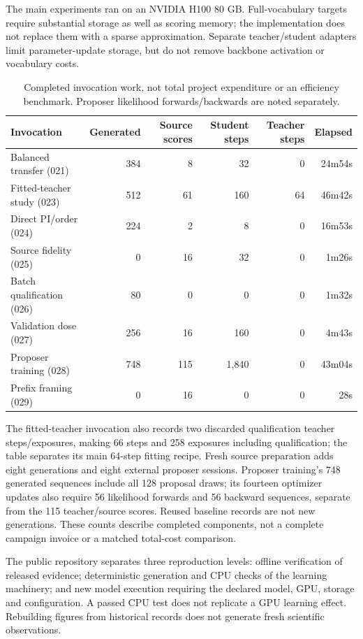 \documentclass[11pt,letterpaper]{article}
\begin{document}
The main experiments ran on an NVIDIA H100 80 GB. Full-vocabulary targets require substantial storage as well as scoring memory; the implementation does not replace them with a sparse approximation. Separate teacher/student adapters limit parameter-update storage, but do not remove backbone activation or vocabulary costs.

\begin{table}[htbp]
\centering\scriptsize
\caption{Completed invocation work, not total project expenditure or an efficiency benchmark. Proposer likelihood forwards/backwards are noted separately.}
\label{tab:work}
\begin{tabular}{L{1.72in}rrrrr}
\toprule
Invocation & Generated & Source scores & Student steps & Teacher steps & Elapsed\\
\midrule
Balanced transfer (021) & 384 & 8 & 32 & 0 & 24m54s\\
Fitted-teacher study (023) & 512 & 61 & 160 & 64 & 46m42s\\
Direct PI/order (024) & 224 & 2 & 8 & 0 & 16m53s\\
Source fidelity (025) & 0 & 16 & 32 & 0 & 1m26s\\
Batch qualification (026) & 80 & 0 & 0 & 0 & 1m32s\\
Validation dose (027) & 256 & 16 & 160 & 0 & 4m43s\\
Proposer training (028) & 748 & 115 & 1,840 & 0 & 43m04s\\
Prefix framing (029) & 0 & 16 & 0 & 0 & 28s\\
\bottomrule
\end{tabular}
\end{table}

The fitted-teacher invocation also records two discarded qualification teacher steps/exposures, making 66 steps and 258 exposures including qualification; the table separates its main 64-step fitting recipe. Fresh source preparation adds eight generations and eight external proposer sessions. Proposer training's 748 generated sequences include all 128 proposal draws; its fourteen optimizer updates also require 56 likelihood forwards and 56 backward sequences, separate from the 115 teacher/source scores. Reused baseline records are not new generations. These counts describe completed components, not a complete campaign invoice or a matched total-cost comparison.

The public repository separates three reproduction levels: offline verification of released evidence; deterministic generation and CPU checks of the learning machinery; and new model execution requiring the declared model, GPU, storage and configuration. A passed CPU test does not replicate a GPU learning effect. Rebuilding figures from historical records does not generate fresh scientific observations.
\end{document}
